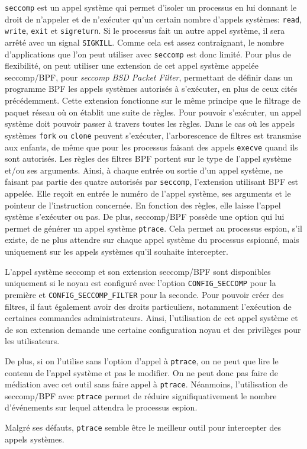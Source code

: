 \texttt{seccomp} \citep{seccompbpf} est un appel système qui permet d'isoler un processus
en lui donnant le droit de n'appeler et de n'exécuter qu'un certain nombre d'appels
systèmes: \texttt{read}, \texttt{write}, \texttt{exit} et \texttt{sigreturn}. Si
le processus fait un autre appel système, il sera arrêté avec un signal
\texttt{SIGKILL}. Comme cela est assez contraignant, le nombre d'applications
que l'on peut utiliser avec \texttt{seccomp} est donc limité. Pour plus de
flexibilité, on peut utiliser une extension de cet appel système appelée
seccomp/BPF, pour \textit{seccomp BSD Packet Filter}, permettant de définir dans
un programme BPF \citep{BPF_mccanne1993bsd} les appels systèmes autorisés à
s'exécuter, en plus de ceux cités précédemment. Cette extension fonctionne sur le
même principe que le filtrage de paquet réseau où on établit une suite de
règles. Pour pouvoir s'exécuter, un appel système doit pouvoir passer à travers
toutes les règles. Dans le cas où les appels systèmes \texttt{fork} ou
\texttt{clone} peuvent s'exécuter, l'arborescence de filtres est transmise aux
enfants, de même que pour les processus faisant des appels \texttt{execve}
quand ils sont autorisés. Les règles des filtres BPF portent sur le type de
l'appel système et/ou ses arguments. Ainsi, à chaque entrée ou sortie d'un appel
système, ne faisant pas partie des quatre autorisés par \texttt{seccomp}, l'extension
utilisant BPF est appelée. Elle reçoit en entrée le numéro de l'appel système,
ses arguments et le pointeur de l'instruction concernée. En fonction des règles,
elle laisse l'appel système s'exécuter ou pas.  De plus, seccomp/BPF possède une
option qui lui permet de générer un appel système \texttt{ptrace}. Cela permet
au processus espion, s'il existe, de ne plus attendre sur chaque appel système
du processus espionné, mais uniquement sur les appels systèmes qu'il souhaite
intercepter.

L'appel système seccomp et son extension seccomp/BPF sont disponibles uniquement si
le noyau est configuré avec l'option \texttt{CONFIG\_SECCOMP} pour la première
et \texttt{CONFIG\_SECCOMP\_FILTER} pour la seconde. Pour pouvoir créer des
filtres, il faut également avoir des droits particuliers, notamment l'exécution
de certaines commandes administrateurs. Ainsi, l'utilisation de cet appel
système et de son extension demande une certaine configuration noyau et des
privilèges pour les utilisateurs.

De plus, si on l'utilise sans l'option d'appel à \texttt{ptrace}, on ne peut que
lire le contenu de l'appel système et pas le modifier. On ne peut donc pas faire
de médiation avec cet outil sans faire appel à \texttt{ptrace}. Néanmoins,
l'utilisation de seccomp/BPF avec \texttt{ptrace} permet de réduire
signifiquativement le nombre d'événements sur lequel attendra le processus
espion.
\vspace{0.5cm}

Malgré ses défauts, \texttt{ptrace} semble être le meilleur outil pour intercepter des appels systèmes.

